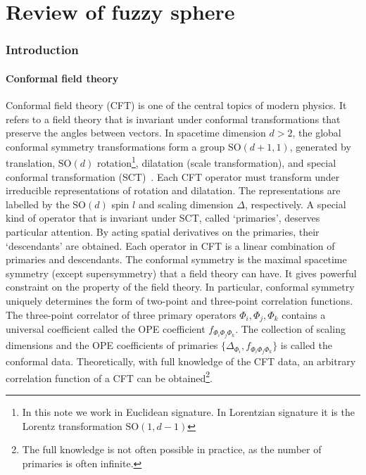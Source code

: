 \documentclass{timesjhep}
\begin{document}
\cleardoublepage
\part{Review of fuzzy sphere}
\label{pt:intro}

\section{Introduction}
\label{sec:intro}

\subsection{Conformal field theory}

Conformal field theory (CFT) is one of the central topics of modern physics. It refers to a field theory that is invariant under conformal transformations that preserve the angles between vectors. In spacetime dimension $d>2$, the global conformal symmetry transformations form a group $\mathrm{SO}(d+1,1)$, generated by translation, $\mathrm{SO}(d)$ rotation\footnote{In this note we work in Euclidean signature. In Lorentzian signature it is the Lorentz transformation $\mathrm{SO}(1,d-1)$}, dilatation (scale transformation), and special conformal transformation (SCT)~\cite{Rychkov2016CFT,SimmonsDuffin2016CFT}. Each CFT operator must transform under irreducible representations of rotation and dilatation. The representations are labelled by the $\mathrm{SO}(d)$ spin $l$ and scaling dimension $\Delta$, respectively. A special kind of operator that is invariant under SCT, called `primaries', deserves particular attention. By acting spatial derivatives on the primaries, their `descendants' are obtained. Each operator in CFT is a linear combination of primaries and descendants. The conformal symmetry is the maximal spacetime symmetry (except supersymmetry) that a field theory can have. It gives powerful constraint on the property of the field theory. In particular, conformal symmetry uniquely determines the form of two-point and three-point correlation functions. The three-point correlator of three primary operators $\Phi_i,\Phi_j,\Phi_k$ contains a universal coefficient called the OPE coefficient $f_{\Phi_i\Phi_j\Phi_k}$. The collection of scaling dimensions and the OPE coefficients of primaries $\{\Delta_{\Phi_i},f_{\Phi_i\Phi_j\Phi_k}\}$ is called the conformal data. Theoretically, with full knowledge of the CFT data, an arbitrary correlation function of a CFT can be obtained\footnote{The full knowledge is not often possible in practice, as the number of primaries is often infinite.}. 
\end{document}
